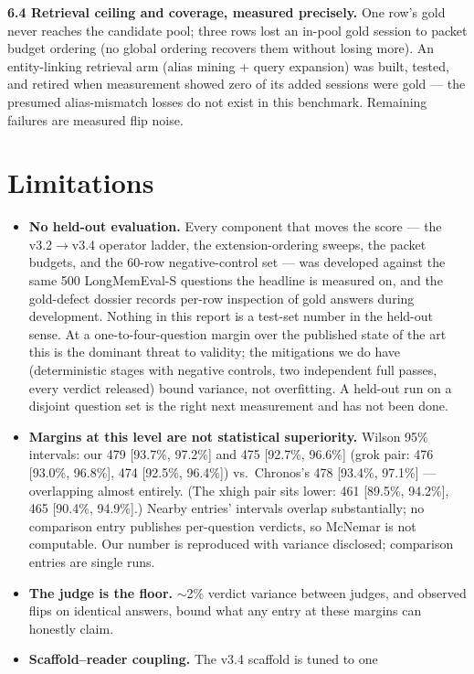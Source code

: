 \documentclass[11pt]{article}
\begin{document}
\textbf{6.4 Retrieval ceiling and coverage, measured precisely.} One row's
gold never reaches the candidate pool; three rows lost an in-pool gold session
to packet budget ordering (no global ordering recovers them without losing
more). An entity-linking retrieval arm (alias mining + query expansion) was built,
tested, and retired when measurement showed zero of its added
sessions were gold --- the presumed alias-mismatch losses do not exist in
this benchmark. Remaining failures are measured flip noise.

\section{Limitations}
\begin{itemize}\setlength{\itemsep}{2pt}\setlength{\parskip}{0pt}\setlength{\parsep}{0pt}
\item \textbf{No held-out evaluation.} Every component that moves the score
--- the v3.2$\to$v3.4 operator ladder, the extension-ordering sweeps, the
packet budgets, and the 60-row negative-control set --- was developed
against the same 500 LongMemEval-S questions the headline is measured on,
and the gold-defect dossier records per-row inspection of gold answers
during development. Nothing in this report is a test-set number in the
held-out sense. At a one-to-four-question margin over the published state
of the art this is the dominant threat to validity; the mitigations we do
have (deterministic stages with negative controls, two independent full
passes, every verdict released) bound variance, not overfitting. A
held-out run on a disjoint question set is the right next measurement and
has not been done.
\item \textbf{Margins at this level are not statistical superiority.}
Wilson 95\% intervals: our 479 [93.7\%, 97.2\%] and 475 [92.7\%, 96.6\%]
(grok pair: 476 [93.0\%, 96.8\%], 474 [92.5\%, 96.4\%]) vs.\ Chronos's 478
[93.4\%, 97.1\%] --- overlapping almost entirely. (The xhigh pair sits lower:
461 [89.5\%, 94.2\%], 465 [90.4\%, 94.9\%].) Nearby entries' intervals overlap substantially; no
comparison entry publishes per-question verdicts, so McNemar is not
computable. Our number is reproduced with variance disclosed; comparison
entries are single runs.
\item \textbf{The judge is the floor.} $\sim$2\% verdict variance between
judges, and observed flips on identical answers, bound what any entry at these
margins can honestly claim.
\item \textbf{Scaffold--reader coupling.} The v3.4 scaffold is tuned to one

\end{itemize}
\end{document}
